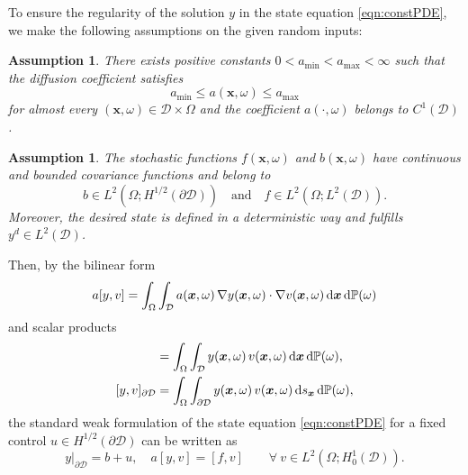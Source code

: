 \documentclass[a4paper,10pt]{article}
\newcommand{\bx}{{\boldsymbol{x}}}
\newcommand{\cD}{{\mathcal{D}}}
\renewcommand{\P}{{\mathbb{P}}}
\renewcommand{\d}{\textup{d}}
\newtheorem{assumption}[theorem]{Assumption}
\numberwithin{theorem}{section}
\begin{document}
To ensure the regularity of the solution $y$ in the state equation \eqref{eqn:constPDE}, we make the following assumptions on the given random inputs:
\begin{assumption}\label{asm:a_coef}
   There exists positive constants $0 < a_{\min} < a_{\max} < \infty$  such that  the diffusion coefficient satisfies
     \[
         a_{\min} \leq  a(\boldsymbol{x},\omega) \leq a_{\max}
     \]
   for almost every  $(\boldsymbol{x},\omega) \in  \mathcal{D} \times \Omega$ and the coefficient  $a(\cdot,\omega)$ belongs to  $C^1(\cD)$.
\end{assumption}
\begin{assumption}\label{asm:fb_coef}
   The stochastic functions  $f(\bx,\omega)$ and $b(\bx,\omega)$ have continuous and bounded covariance functions and belong to 
     \[
         b \in  L^2(\Omega; H^{1/2}(\partial\cD)) \quad \text{and} \quad f \in  L^2(\Omega; L^{2}( \cD)).
     \]
    Moreover, the desired state is defined in a deterministic way and fulfills $y^d \in L^2(\cD)$. 
\end{assumption}
\noindent Then, by the bilinear form 
\begin{equation*}
  a[y,v] = \int_\Omega \int_\cD a(\bx,\omega)\, \nabla y(\bx,\omega)\cdot \nabla v(\bx,\omega)\,\d \bx\,\d\P(\omega)
\end{equation*}
and scalar products
\begin{align*}
  [y,v] &= \int_\Omega \int_\cD y(\bx,\omega)\, v(\bx,\omega)\,\d \bx\,\d\P(\omega), \\
  [y,v]_{\partial\cD} &= \int_\Omega\int_{\partial\cD} y(\bx,\omega)\, v(\bx,\omega)\,\d s_\bx\,\d\P(\omega),
\end{align*}
the standard weak formulation of the state equation \eqref{eqn:constPDE} for a fixed control $u\in H^{1/2}(\partial\cD)$ can be written as 
\begin{equation}\label{eq:weak_satte}
 y|_{\partial\cD}= b+u,\quad a[y,v] = [f,v] \qquad \forall \ v\in L^2(\Omega; H_0^1(\cD)).
\end{equation}
\end{document}

